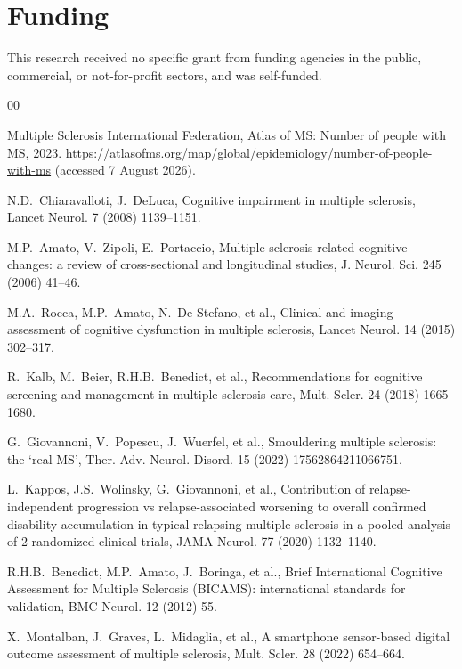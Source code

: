 \documentclass[preprint,12pt,a4paper]{elsarticle}
\begin{document}
\section*{Funding}
This research received no specific grant from funding agencies in the public,
commercial, or not-for-profit sectors, and was self-funded.

\begin{thebibliography}{00}

Multiple Sclerosis International Federation,
Atlas of MS: Number of people with MS, 2023.
\url{https://atlasofms.org/map/global/epidemiology/number-of-people-with-ms}
(accessed 7 August 2026).

N.D.~Chiaravalloti, J.~DeLuca,
Cognitive impairment in multiple sclerosis,
Lancet Neurol. 7 (2008) 1139--1151.

M.P.~Amato, V.~Zipoli, E.~Portaccio,
Multiple sclerosis-related cognitive changes: a review of cross-sectional
and longitudinal studies,
J. Neurol. Sci. 245 (2006) 41--46.

M.A.~Rocca, M.P.~Amato, N.~De Stefano, et al.,
Clinical and imaging assessment of cognitive dysfunction in multiple
sclerosis,
Lancet Neurol. 14 (2015) 302--317.

R.~Kalb, M.~Beier, R.H.B.~Benedict, et al.,
Recommendations for cognitive screening and management in multiple
sclerosis care,
Mult. Scler. 24 (2018) 1665--1680.

G.~Giovannoni, V.~Popescu, J.~Wuerfel, et al.,
Smouldering multiple sclerosis: the `real MS',
Ther. Adv. Neurol. Disord. 15 (2022) 17562864211066751.

L.~Kappos, J.S.~Wolinsky, G.~Giovannoni, et al.,
Contribution of relapse-independent progression vs relapse-associated
worsening to overall confirmed disability accumulation in typical relapsing
multiple sclerosis in a pooled analysis of 2 randomized clinical trials,
JAMA Neurol. 77 (2020) 1132--1140.

R.H.B.~Benedict, M.P.~Amato, J.~Boringa, et al.,
Brief International Cognitive Assessment for Multiple Sclerosis (BICAMS):
international standards for validation,
BMC Neurol. 12 (2012) 55.

X.~Montalban, J.~Graves, L.~Midaglia, et al.,
A smartphone sensor-based digital outcome assessment of multiple sclerosis,
Mult. Scler. 28 (2022) 654--664.


\end{thebibliography}
\end{document}
